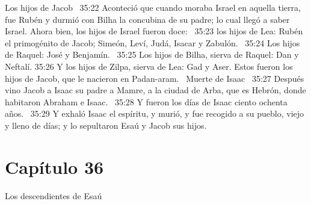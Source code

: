 Los hijos de Jacob 
35:22 Aconteció que cuando moraba Israel en aquella tierra, fue Rubén y durmió con Bilha la concubina de su padre; lo cual llegó a saber Israel. Ahora bien, los hijos de Israel fueron doce:  
35:23 los hijos de Lea: Rubén el primogénito de Jacob; Simeón, Leví, Judá, Isacar y Zabulón.  
35:24 Los hijos de Raquel: José y Benjamín.  
35:25 Los hijos de Bilha, sierva de Raquel: Dan y Neftalí. 
35:26 Y los hijos de Zilpa, sierva de Lea: Gad y Aser. Estos fueron los hijos de Jacob, que le nacieron en Padan-aram.  
Muerte de Isaac  
35:27 Después vino Jacob a Isaac su padre a Mamre, a la ciudad de Arba, que es Hebrón, donde habitaron Abraham e Isaac.  
35:28 Y fueron los días de Isaac ciento ochenta años.  
35:29 Y exhaló Isaac el espíritu, y murió, y fue recogido a su pueblo, viejo y lleno de días; y lo sepultaron Esaú y Jacob sus hijos.  
\section*{Capítulo 36 }
Los descendientes de Esaú   

